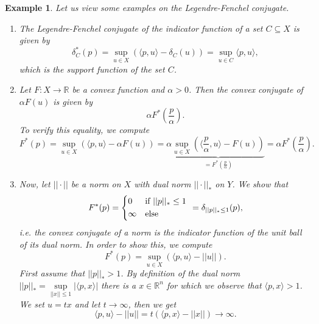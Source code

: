 \documentclass[abstracton]{scrreprt}
\newtheorem{example}[theorem]{Example}
\begin{document}
        \begin{example}
        \label{ex:legendre_fenchel_conjugate_example}
            Let us view some examples on the Legendre-Fenchel conjugate.
            \begin{enumerate}
                \item The Legendre-Fenchel conjugate of the indicator function of a set $C \subseteq X$ is given by
                    $$
                        \delta^{\ast}_{C}(p) = \sup_{u \in X} \left( \langle p, u \rangle - \delta_{C}(u) \right) = \sup_{u \in C} \langle p, u \rangle,
                    $$
                which is the support function of the set $C$.
                \item Let $F: X \to \mathbb{R}$ be a convex function and $\alpha > 0$. Then the convex conjugate of $\alpha F(u)$ is given by
                    $$
                        \alpha F^{\ast}(\frac{p}{\alpha}).
                    $$
                To verify this equality, we compute
                    $$
                        F^{\ast}(p) = \sup_{u \in X} \left( \langle p, u \rangle - \alpha F(u) \right) = \alpha \underbrace{\sup_{u \in X} \left( \langle \frac{p}{\alpha}, u \rangle - F(u) \right)}_{= F^{\ast}(\frac{p}{\alpha})} = \alpha F^{\ast}(\frac{p}{\alpha}).
                    $$
                \item Now, let $||\cdot||$ be a norm on $X$ with dual norm $||\cdot||_{\ast}$ on $Y$. We show that
                    $$
                        F^{\ast}(p) =
                            \begin{dcases*}
                                0 & \textnormal{if $||p||_{\ast} \le 1$} \\
                                \infty & \textnormal{else}
                            \end{dcases*}
                        = \delta_{||p||_{\ast} \le 1}(p),
                    $$
                i.e. the convex conjugate of a norm is the indicator function of the unit ball of its dual norm. In order to show this, we compute
                    $$
                        F^{\ast}(p) = \sup_{u \in X} \left( \langle p, u \rangle - ||u|| \right).
                    $$
                First assume that $||p||_{\ast} > 1$. By definition of the dual norm $||p||_{\ast} = \sup\limits_{||x|| \le 1} |\langle p, x \rangle|$ there is a $x \in \mathbb{R}^{n}$ for which we observe that $\langle p, x \rangle > 1$. We set $u = tx$ and let $t \longrightarrow \infty$, then we get
                    $$
                        \langle p, u \rangle - ||u|| = t(\langle p, x \rangle - ||x||) \longrightarrow \infty.
$$
\end{enumerate}
\end{example}
\end{document}
